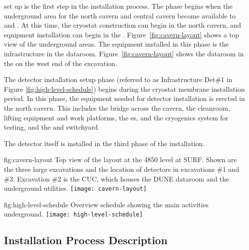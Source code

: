  set up is the first step in the installation process. The phase begins when the underground area for the north cavern and central cavern become available to  and . At this time, the  cryostat construction can begin in the north cavern, and  equipment installation can begin in the . Figure~\ref{fig:cavern-layout} shows a top view of the underground areas. The  equipment  installed in this phase is the infrastructure in the  dataroom. Figure~\ref{fig:cavern-layout} shows the dataroom in the  on the west end of the excavation. 

The detector installation setup phase (referred to as Infrastructure Det\#1 in Figure \ref{fig:high-level-schedule}) begins during the cryostat membrane installation period. In this phase, the equipment needed for detector installation is erected in the north cavern. This includes the bridge across the cavern, the cleanroom, lifting equipment and work platforms, the \coldbox{}es, and the cryogenics system for  testing, and the  and switchyard. 

The detector itself is installed in the third phase of the installation. 

\begin{dunefigure}{fig:cavern-layout}
  {Top view of the layout at the 4850 level at SURF. Shown are the three large excavations and the location of detectors in excavations \#1 and \#3. Excavation \#2 is the CUC, which houses the DUNE dataroom and the underground utilities.}
\texttt{[image: cavern-layout]}
\end{dunefigure}

\begin{dunefigure}{fig:high-level-schedule}
  {Overview schedule showing the main activities underground.}
\texttt{[image: high-level-schedule]}
\end{dunefigure}

\subsection{Installation Process Description}
\label{sec:fdsp-tc-inst-proc}



